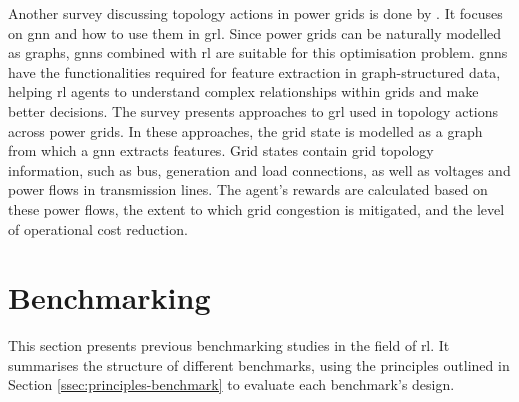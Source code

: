 Another survey discussing topology actions in power grids is done by \citet{grl4powergrids}. It focuses on \ac{gnn} and how to use them in \ac{grl}. Since power grids can be naturally modelled as graphs, \acp{gnn} combined with \ac{rl} are suitable for this optimisation problem. \acp{gnn} have the functionalities required for feature extraction in graph-structured data, helping \ac{rl} agents to understand complex relationships within grids and make better decisions. The survey presents approaches to \ac{grl} used in topology actions across power grids. In these approaches, the grid state is modelled as a graph from which a \ac{gnn} extracts features. Grid states contain grid topology information, such as bus, generation and load connections, as well as voltages and power flows in transmission lines. The agent's rewards are calculated based on these power flows, the extent to which grid congestion is mitigated, and the level of operational cost reduction.



\section{Benchmarking}\label{sec:rw-benchmarking}
This section presents previous benchmarking studies in the field of \ac{rl}. It summarises the structure of different benchmarks, using the principles outlined in Section \ref{ssec:principles-benchmark} to evaluate each benchmark's design.


